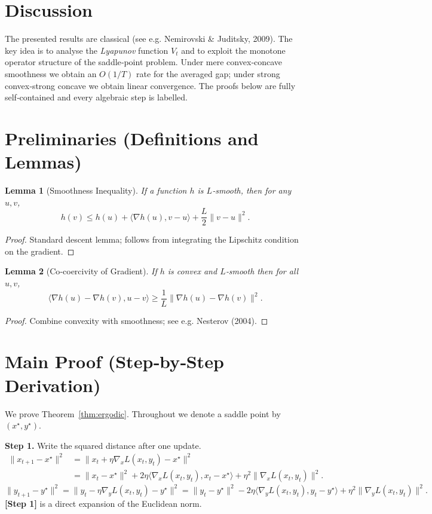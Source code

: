 \documentclass{article}
\newtheorem{lemma}{Lemma}
\newcommand{\grad}{\nabla}
\begin{document}
\section*{Discussion}
The presented results are classical (see e.g. Nemirovski \& Juditsky, 2009). The key idea is to analyse the \emph{Lyapunov} function $V_{t}$ and to exploit the monotone operator structure of the saddle‑point problem. Under mere convex‑concave smoothness we obtain an $O(1/T)$ rate for the averaged gap; under strong convex‑strong concave we obtain linear convergence. The proofs below are fully self‑contained and every algebraic step is labelled.

\newpage
\section*{Preliminaries (Definitions and Lemmas)}
\begin{lemma}[Smoothness Inequality]\label{lem:smooth}
If a function $h$ is $L$‑smooth, then for any $u,v$,
\[
h(v)\le h(u)+\langle\grad h(u),v-u\rangle+\frac{L}{2}\|v-u\|^{2}.
\]
\end{lemma}
\begin{proof}
Standard descent lemma; follows from integrating the Lipschitz condition on the gradient. \qedhere
\end{proof}

\begin{lemma}[Co‑coercivity of Gradient]\label{lem:coco}
If $h$ is convex and $L$‑smooth then for all $u,v$,
\[
\langle\grad h(u)-\grad h(v),u-v\rangle\ge\frac{1}{L}\|\grad h(u)-\grad h(v)\|^{2}.
\]
\end{lemma}
\begin{proof}
Combine convexity with smoothness; see e.g. Nesterov (2004). \qedhere
\end{proof}

\section*{Main Proof (Step‑by‑Step Derivation)}
We prove Theorem~\ref{thm:ergodic}.  Throughout we denote a saddle point by $(x^{\star},y^{\star})$.

\bigskip
\noindent\textbf{Step 1.}  Write the squared distance after one update.
\begin{align}
\|x_{t+1}-x^{\star}\|^{2}
&=\|x_{t}+\eta\grad_{x}L(x_{t},y_{t})-x^{\star}\|^{2}\nonumber\\
&=\|x_{t}-x^{\star}\|^{2}+2\eta\langle\grad_{x}L(x_{t},y_{t}),x_{t}-x^{\star}\rangle
   +\eta^{2}\|\grad_{x}L(x_{t},y_{t})\|^{2}.
\label{eq:xt}
\end{align}
\begin{equation}
\|y_{t+1}-y^{\star}\|^{2}
=\|y_{t}-\eta\grad_{y}L(x_{t},y_{t})-y^{\star}\|^{2}
=\|y_{t}-y^{\star}\|^{2}
-2\eta\langle\grad_{y}L(x_{t},y_{t}),y_{t}-y^{\star}\rangle
+\eta^{2}\|\grad_{y}L(x_{t},y_{t})\|^{2}.
\label{eq:yt}
\end{equation}
\noindent\textbf{[Step 1]} is a direct expansion of the Euclidean norm.
\end{document}
